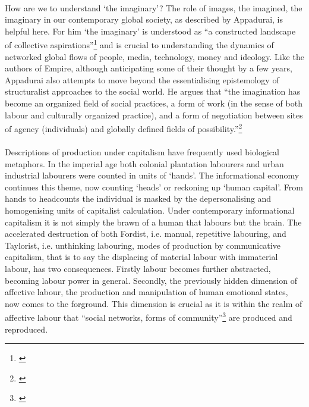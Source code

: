 \documentclass[12pt,a4paper,titlepage]{article}
\begin{document}
\paragraph{}How are we to understand `the imaginary'? The role of images, the imagined, the imaginary in our contemporary global society, as described by Appadurai, is helpful here. For him `the imaginary' is understood as ``a constructed landscape of collective aspirations''\footnote{\cite[p. 31]{Appadurai:1996lp}} and is crucial to understanding the dynamics of networked global flows of people, media, technology, money and ideology. Like the authors of Empire, although anticipating some of their thought by a few years, Appadurai also attempts to move beyond the essentialising epistemology of structuralist approaches to the social world. He argues that ``the imagination has become an organized field of social practices, a form of work (in the sense of both labour and culturally organized practice), and a form of negotiation between sites of agency (individuals) and globally defined fields of possibility.''\footnote{\cite[p. 31]{Appadurai:1996lp}}

\paragraph{}Descriptions of production under capitalism have frequently used biological metaphors. In the imperial age both colonial plantation labourers and urban industrial labourers were counted in units of `hands'. The informational economy continues this theme, now counting `heads' or reckoning up `human capital'. From hands to headcounts the individual is masked by the depersonalising and homogenising units of capitalist calculation. Under contemporary informational capitalism it is not simply the brawn of a human that labours but the brain. The accelerated destruction of both Fordist, i.e. manual, repetitive labouring, and Taylorist, i.e. unthinking labouring, modes of production by communicative capitalism, that is to say the displacing of material labour with immaterial labour, has two consequences. Firstly labour becomes further abstracted, becoming labour power in general. Secondly, the previously hidden dimension of affective labour, the production and manipulation of human emotional states, now comes to the forground. This dimension is crucial as it is within the realm of affective labour that ``social networks, forms of community''\footnote{\cite[p. 293]{Hardt:2001jl}} are produced and reproduced.
\end{document}
